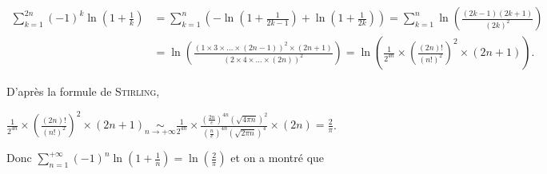 {{\begin{align*}
\sum_{k=1}^{2n}(-1)^k\ln\left(1+\frac{1}{k}\right)&=\sum_{k=1}^{n}\left(-\ln\left(1+\frac{1}{2k-1}\right)+\ln\left(1+\frac{1}{2k}\right)\right)=\sum_{k=1}^{n}\ln\left(\frac{(2k-1)(2k+1)}{(2k)^2}\right)\\
 &=\ln\left(\frac{(1\times3\times\ldots\times(2n-1))^2\times(2n+1)}{(2\times4\times\ldots\times(2n))^2}\right) =\ln\left(\frac{1}{2^{4n}}\times\left(\frac{(2n)!}{(n!)^2}\right)^2\times(2n+1)\right) .
\end{align*}
 

D'après la formule de \textsc{Stirling},   

\begin{center}
$\frac{1}{2^{4n}}\times\left(\frac{(2n)!}{(n!)^2}\right)^2\times(2n+1)\underset{n\rightarrow+\infty}{\sim}\frac{1}{2^{4n}}\times\frac{\left(\frac{2n}{e}\right)^{4n}(\sqrt{4\pi n})^2}{\left(\frac{n}{e}\right)^{4n}(\sqrt{2\pi n})^4}\times(2n)=\frac{2}{\pi}$.
\end{center}

Donc $\sum_{n=1}^{+\infty}(-1)^n\ln\left(1+\frac{1}{n}\right)=\ln\left(\frac{2}{\pi}\right)$ et on a montré que

\begin{center}
\end{center}
}
}
